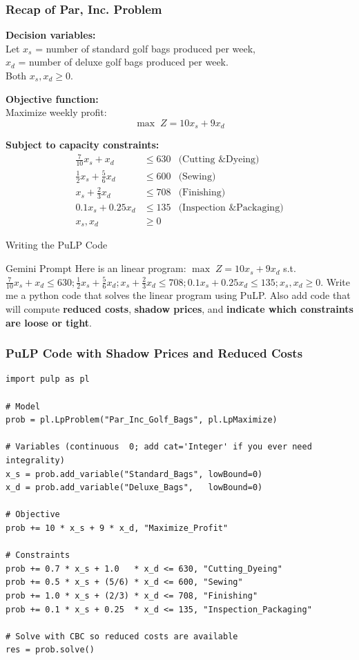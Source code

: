 \documentclass{beamer}
\begin{document}
\begin{frame}[shrink]
\frametitle{Recap of Par, Inc. Problem}
\textbf{Decision variables:} \\
Let \(x_s\) = number of standard golf bags produced per week,\\
\(x_d\) = number of deluxe golf bags produced per week. \\
Both \(x_s, x_d \ge 0\).

\textbf{Objective function:} \\
Maximize weekly profit:
\[
\max \; Z = 10x_s + 9x_d
\]

\textbf{Subject to capacity constraints:}
\[
\begin{aligned}
\frac{7}{10}x_s + x_d &\le 630 &\text{(Cutting \& Dyeing)} \\
\frac{1}{2}x_s + \frac{5}{6}x_d &\le 600 &\text{(Sewing)} \\
x_s + \frac{2}{3}x_d &\le 708 &\text{(Finishing)} \\
0.1x_s + 0.25x_d &\le 135 &\text{(Inspection \& Packaging)} \\
x_s, x_d &\ge 0
\end{aligned}
\]
\end{frame}



\begin{frame}{Writing the PuLP Code}
\begin{exampleblock}{Gemini Prompt}
\vspace{0.1cm}
Here is an linear program:
\(
\max \; Z = 10x_s + 9x_d
\)
s.t. 
\(\frac{7}{10}x_s + x_d\le 630; \frac{1}{2}x_s + \frac{5}{6}x_d; x_s + \frac{2}{3}x_d\le 708; 0.1x_s + 0.25x_d\le 135; 
x_s, x_d \ge 0\). Write me a python code that solves the linear program using PuLP. Also add code that will compute \textbf{reduced costs}, \textbf{shadow prices}, and \textbf{indicate which constraints are loose or tight}. 
\vspace{0.1cm}
\end{exampleblock}
\end{frame}


\begin{frame}[fragile]
\frametitle{PuLP Code with Shadow Prices and Reduced Costs}
\begin{lstlisting}
import pulp as pl

# Model
prob = pl.LpProblem("Par_Inc_Golf_Bags", pl.LpMaximize)

# Variables (continuous  0; add cat='Integer' if you ever need integrality)
x_s = prob.add_variable("Standard_Bags", lowBound=0)
x_d = prob.add_variable("Deluxe_Bags",   lowBound=0)

# Objective
prob += 10 * x_s + 9 * x_d, "Maximize_Profit"

# Constraints
prob += 0.7 * x_s + 1.0   * x_d <= 630, "Cutting_Dyeing"
prob += 0.5 * x_s + (5/6) * x_d <= 600, "Sewing"
prob += 1.0 * x_s + (2/3) * x_d <= 708, "Finishing"
prob += 0.1 * x_s + 0.25  * x_d <= 135, "Inspection_Packaging"

# Solve with CBC so reduced costs are available
res = prob.solve()
\end{lstlisting}
\end{frame}
\end{document}
